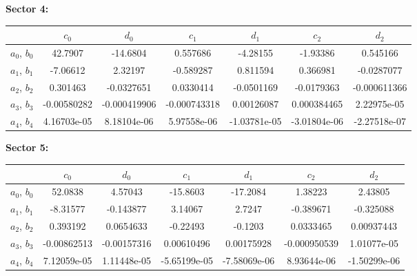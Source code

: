 \vspace{0.5cm}


{\bf Sector 4:}
\begin{table}[h]
\scriptsize
 \begin{center}
  \begin{tabular}{c|c|c|c|c|c|c}
    \hline 
    & $c_0$ & $d_0$ & $c_1$ & $d_1$     & $c_2$ & $d_2$ \\
    \hline  
   $a_0$, $b_0$ &   42.7907  &  -14.6804  &  0.557686  &  -4.28155  &  -1.93386  &  0.545166  \\
   $a_1$, $b_1$ &   -7.06612  &  2.32197  &  -0.589287  &  0.811594  &  0.366981  &  -0.0287077  \\
   $a_2$, $b_2$ & 0.301463  &  -0.0327651  &  0.0330414  &  -0.0501169  &  -0.0179363  &  -0.000611366  \\
   $a_3$, $b_3$ &  -0.00580282  &  -0.000419906  &  -0.000743318  &  0.00126087  &  0.000384465  &  2.22975e-05 \\
   $a_4$, $b_4$ &   4.16703e-05  &  8.18104e-06  &  5.97558e-06  &  -1.03781e-05  &  -3.01804e-06  &  -2.27518e-07  \\
 \hline
  \end{tabular}
 \end{center} 
\end{table}





{\bf Sector 5:}
\begin{table}[h]
\scriptsize
 \begin{center}
  \begin{tabular}{c|c|c|c|c|c|c}
    \hline 
    & $c_0$ & $d_0$ & $c_1$ & $d_1$     & $c_2$ & $d_2$ \\
    \hline  
   $a_0$, $b_0$ &  52.0838  &  4.57043  &  -15.8603  &  -17.2084  &  1.38223  &  2.43805   \\
   $a_1$, $b_1$ &  -8.31577  &  -0.143877  &  3.14067  &  2.7247  &  -0.389671  &  -0.325088  \\ 
   $a_2$, $b_2$ & 0.393192  &  0.0654633  &  -0.22493  &  -0.1203  &  0.0333465  &  0.00937443  \\
   $a_3$, $b_3$ & -0.00862513  &  -0.00157316  &  0.00610496  &  0.00175928  &  -0.000950539  &  1.01077e-05  \\ 
   $a_4$, $b_4$ & 7.12059e-05  &  1.11448e-05  &  -5.65199e-05  &  -7.58069e-06  &  8.93644e-06  &  -1.50299e-06  \\ 
 \hline
  \end{tabular}
 \end{center} 
\end{table}


